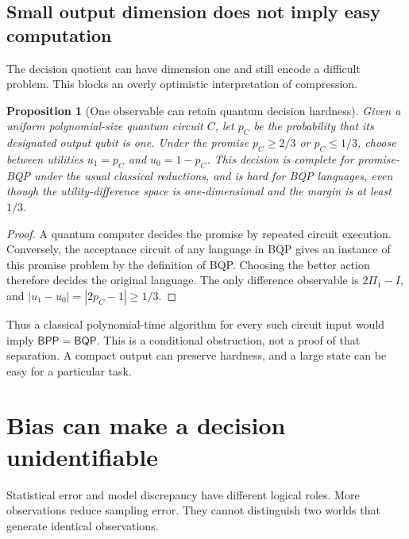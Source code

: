 \documentclass[11pt,a4paper]{article}
\newcommand{\BPP}{\mathsf{BPP}}
\newcommand{\BQP}{\mathsf{BQP}}
\newtheorem{proposition}[theorem]{Proposition}
\theoremstyle{definition}
\theoremstyle{remark}
\numberwithin{equation}{section}
\begin{document}
\subsection{Small output dimension does not imply easy computation}
The decision quotient can have dimension one and still encode a difficult
problem. This blocks an overly optimistic interpretation of compression.

\begin{proposition}[One observable can retain quantum decision hardness]
Given a uniform polynomial-size quantum circuit $C$, let
$p_C$ be the probability that its designated output qubit is one.
Under the promise $p_C\geq2/3$ or $p_C\leq1/3$, choose between utilities
$u_1=p_C$ and $u_0=1-p_C$. This decision is complete for promise-BQP under the usual
classical reductions, and is hard for BQP languages, even though the utility-difference space is
one-dimensional and the margin is at least $1/3$.
\end{proposition}
\begin{proof}
A quantum computer decides the promise by repeated circuit execution.
Conversely, the acceptance circuit of any language in BQP gives an instance
of this promise problem by the definition of BQP. Choosing the better action
therefore decides the original language. The only difference observable is
$2\Pi_1-I$, and $|u_1-u_0|=|2p_C-1|\geq1/3$.
\end{proof}

Thus a classical polynomial-time algorithm for every such circuit input
would imply $\BPP=\BQP$. This is a conditional obstruction, not a proof of
that separation. A compact output can preserve hardness, and a large state
can be easy for a particular task.

\section{Bias can make a decision unidentifiable}\label{sec:identification}
Statistical error and model discrepancy have different logical roles.
More observations reduce sampling error. They cannot distinguish two
worlds that generate identical observations.
\end{document}
